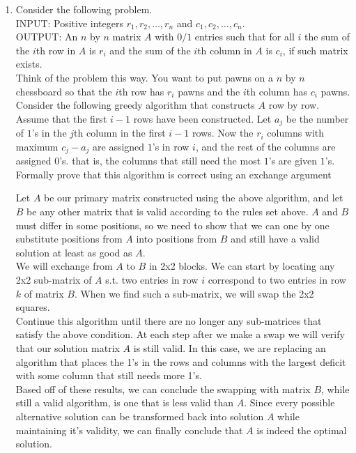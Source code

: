 \documentclass{article}
\begin{document}
\begin{enumerate}
\newpage 
\item Consider the following problem. \\
INPUT: Positive integers $r_1, r_2, \dots, r_n$ and $c_1, c_2, \dots, c_n$. \\
OUTPUT: An $n$ by $n$ matrix $A$ with $0/1$ entries such that for all $i$ the sum of the $i$th row in $A$ is $r_i$ and the sum of the $i$th column in $A$ is $c_i$, if such matrix exists. \\
Think of the problem this way. You want to put pawns on a $n$ by $n$ chessboard so that the $i$th row has $r_i$ pawns and the $i$th column has $c_i$ pawns. Consider the following greedy algorithm that constructs $A$ row by row. Assume that the first $i-1$ rows have been constructed. Let $a_j$ be the number of $1$'s in the $j$th column in the first $i-1$ rows. Now the $r_i$ columns with maximum $c_j - a_j$ are assigned $1$'s in row $i$, and the rest of the columns are assigned $0$'s. that is, the columns that still need the most $1$'s are given $1$'s. Formally prove that this algorithm is correct using an exchange argument\\
\newline

Let $A$ be our primary matrix constructed using the above algorithm, and let $B$ be any other matrix that is valid according to the rules set above. $A$ and $B$ must differ in some positions, so we need to show that we can one by one substitute positions from $A$ into positions from $B$ and still have a valid solution at least as good as $A$. \\
\newline 
We will exchange from $A$ to $B$ in 2x2 blocks. We can start by locating any 2x2 sub-matrix of $A$ s.t. two entries in row $i$ correspond to two entries in row $k$ of matrix $B$. When we find such a sub-matrix, we will swap the 2x2 squares. \\
Continue this algorithm until there are no longer any sub-matrices that satisfy the above condition. At each step after we make a swap we will verify that our solution matrix $A$ is still valid. In this case, we are replacing an algorithm that places the 1's in the rows and columns with the largest deficit with some column that still needs more 1's. \\
\newline 
Based off of these results, we can conclude the swapping with matrix $B$, while still a valid algorithm, is one that is less valid than $A$. Since every possible alternative solution can be transformed back into solution $A$ while maintaining it's validity, we can finally conclude that $A$ is indeed the optimal solution. 




    
\end{enumerate}
\end{document}
